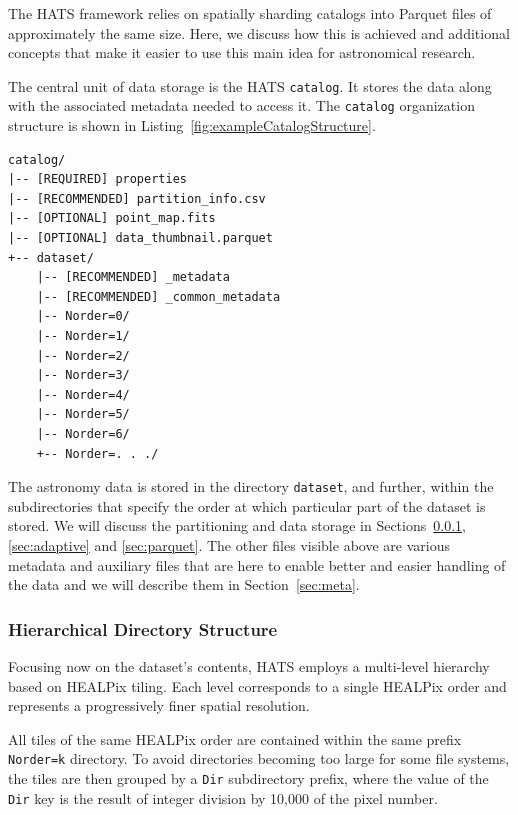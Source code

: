 \documentclass[11pt,a4paper]{ivoa}
\begin{document}
The HATS framework relies on spatially sharding catalogs into Parquet files of approximately the same size. 
Here, we discuss how this is achieved and additional concepts that make it easier to use this main idea for astronomical research.

The central unit of data storage is the HATS \texttt{catalog}. 
It stores the data along with the associated metadata needed to access it. 
The  \texttt{catalog} organization structure is shown in Listing~\ref{fig:exampleCatalogStructure}.

\begin{minipage}{\linewidth}
\begin{lstlisting}[caption=Example catalog directory contents, label=fig:exampleCatalogStructure]
catalog/
|-- [REQUIRED] properties
|-- [RECOMMENDED] partition_info.csv
|-- [OPTIONAL] point_map.fits
|-- [OPTIONAL] data_thumbnail.parquet
+-- dataset/
    |-- [RECOMMENDED] _metadata
    |-- [RECOMMENDED] _common_metadata
    |-- Norder=0/
    |-- Norder=1/
    |-- Norder=2/
    |-- Norder=3/
    |-- Norder=4/
    |-- Norder=5/
    |-- Norder=6/
    +-- Norder=. . ./
\end{lstlisting}
\end{minipage}

The astronomy data is stored in the directory \texttt{dataset}, and further, within the subdirectories that specify the order at which particular part of the dataset is stored. 
We will discuss the partitioning and data storage in Sections~\ref{sec:hierarchical}, \ref{sec:adaptive} and \ref{sec:parquet}. 
The other files visible above are various metadata and auxiliary files that are here to enable better and easier handling of the data and we will describe them in Section~\ref{sec:meta}. 
    
\subsubsection{Hierarchical Directory Structure} \label{sec:hierarchical}
Focusing now on the dataset's contents, HATS employs a multi-level hierarchy based on HEALPix tiling.
Each level corresponds to a single HEALPix order and represents a progressively finer spatial resolution.

All tiles of the same HEALPix order are contained within the same prefix \texttt{Norder=k} directory. 
To avoid directories becoming too large for some file systems, the tiles are then grouped by a \texttt{Dir} subdirectory prefix,
where the value of the \texttt{Dir} key is the result of integer division by 10,000 of the pixel number.
\end{document}
